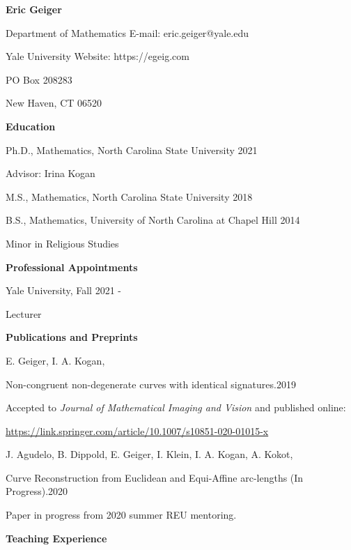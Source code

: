 \documentclass{article}
\begin{document}
\textsf{\textbf{\LARGE Eric Geiger}}

\bigskip

Department of Mathematics \hfill E-mail: eric.geiger@yale.edu%

Yale University \hfill Website: https://egeig.com 

PO Box 208283 \hfill 

New Haven, CT 06520

\bigskip
\bigskip
\bigskip

\textsf{\textbf{\Large Education} \hrulefill}

\medskip
Ph.D., Mathematics, North Carolina State University \hfill 2021

Advisor: Irina Kogan

\medskip
 M.S., Mathematics, North Carolina State University  \hfill 2018

\medskip
B.S., Mathematics, University of North Carolina at Chapel Hill \hfill 2014

Minor in Religious Studies
        
\bigskip
\bigskip

\textsf{\textbf{\Large Professional Appointments} \hrulefill}

\medskip

Yale University, \hfill Fall 2021 -

Lecturer

%
\bigskip
\bigskip

\textsf{\textbf{\Large Publications and Preprints} \hrulefill}

\medskip
E. Geiger, I. A. Kogan, 

Non-congruent non-degenerate curves with identical signatures.\hfill 2019

Accepted to \textit{Journal of Mathematical Imaging and Vision} and published online:

\url{https://link.springer.com/article/10.1007/s10851-020-01015-x}

\medskip
J. Agudelo, B. Dippold, E. Geiger, I. Klein, I. A. Kogan, A. Kokot,

Curve Reconstruction from Euclidean and Equi-Affine arc-lengths (In Progress).\hfill 2020

Paper in progress from 2020 summer REU mentoring.

\bigskip
\bigskip

\textsf{\textbf{\Large Teaching Experience} \hrulefill}
\end{document}
